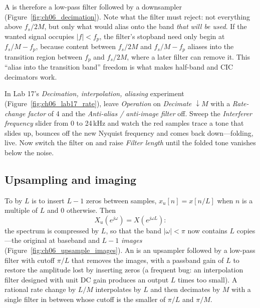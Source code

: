 A  is therefore a low-pass filter followed by a downsampler
(Figure~\ref{fig:ch06_decimation}). Note what the filter must reject: not everything above
$f_s/2M$, but only what would alias onto the band \emph{that will be used}. If the wanted signal
occupies $|f|<f_p$, the filter's stopband need only begin at $f_s/M-f_p$, because content between
$f_s/2M$ and $f_s/M-f_p$ aliases into the transition region between $f_p$ and $f_s/2M$, where a
later filter can remove it. This ``alias into the transition band'' freedom is what makes half-band
and CIC decimators work.



\begin{tryit}
In Lab 17's \emph{Decimation, interpolation, aliasing} experiment (Figure~\ref{fig:ch06_lab17_rate}), leave \emph{Operation} on
\emph{Decimate $\downarrow M$} with a \emph{Rate-change factor} of 4 and the
\emph{Anti-alias / anti-image filter} off. Sweep the \emph{Interferer frequency} slider from 0 to
24\,kHz and watch the red samples trace a tone that slides up, bounces off the new Nyquist frequency
and comes back down---folding, live. Now switch the filter on and raise \emph{Filter length} until the
folded tone vanishes below the noise.
\end{tryit}

\subsection{Upsampling and imaging}

To  by $L$ is to insert $L-1$ zeros between samples, $x_u[n]=x[n/L]$ when $n$ is a
multiple of $L$ and 0 otherwise. Then
\begin{equation}
X_u(e^{j\omega})=X(e^{j\omega L}):
\end{equation}
the spectrum is compressed by $L$, so that the band $|\omega|<\pi$ now contains $L$ copies---the
original at baseband and $L-1$ \emph{images} (Figure~\ref{fig:ch06_upsample_images}). An
 is an upsampler followed by a low-pass filter with cutoff $\pi/L$ that removes
the images, with a passband gain of $L$ to restore the amplitude lost by inserting zeros (a frequent
bug: an interpolation filter designed with unit DC gain produces an output $L$ times too small). A
rational rate change by $L/M$ interpolates by $L$ and then decimates by $M$ with a single filter in
between whose cutoff is the smaller of $\pi/L$ and $\pi/M$.

